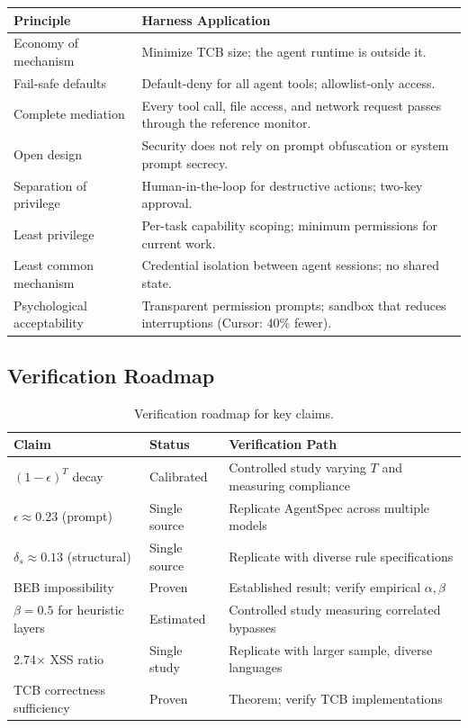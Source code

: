 \documentclass[11pt, a4paper, copyright]{googledeepmind}
\begin{document}
\begin{appendices}
\begin{center}
\small
\begin{tabular}{lp{7cm}}
\toprule
\textbf{Principle} & \textbf{Harness Application} \\
\midrule
Economy of mechanism & Minimize TCB size; the agent runtime is outside it. \\
Fail-safe defaults & Default-deny for all agent tools; allowlist-only access. \\
Complete mediation & Every tool call, file access, and network request passes through the reference monitor. \\
Open design & Security does not rely on prompt obfuscation or system prompt secrecy. \\
Separation of privilege & Human-in-the-loop for destructive actions; two-key approval. \\
Least privilege & Per-task capability scoping; minimum permissions for current work. \\
Least common mechanism & Credential isolation between agent sessions; no shared state. \\
Psychological acceptability & Transparent permission prompts; sandbox that reduces interruptions (Cursor: 40\% fewer). \\
\bottomrule
\end{tabular}
\end{center}

\subsection{Verification Roadmap}

\begin{table}[h]
\centering
\caption{Verification roadmap for key claims.}
\label{tab:verification}
\small
\begin{tabular}{p{4.5cm}p{2.5cm}p{4.5cm}}
\toprule
\textbf{Claim} & \textbf{Status} & \textbf{Verification Path} \\
\midrule
$(1-\epsilon)^T$ decay & Calibrated & Controlled study varying $T$ and measuring compliance \\
$\epsilon \approx 0.23$ (prompt) & Single source & Replicate AgentSpec across multiple models \\
$\delta_s \approx 0.13$ (structural) & Single source & Replicate with diverse rule specifications \\
BEB impossibility & Proven & Established result; verify empirical $\alpha, \beta$ \\
$\beta = 0.5$ for heuristic layers & Estimated & Controlled study measuring correlated bypasses \\
2.74$\times$ XSS ratio & Single study & Replicate with larger sample, diverse languages \\
TCB correctness sufficiency & Proven & Theorem; verify TCB implementations \\
\bottomrule
\end{tabular}
\end{table}

\end{appendices}


\end{document}
